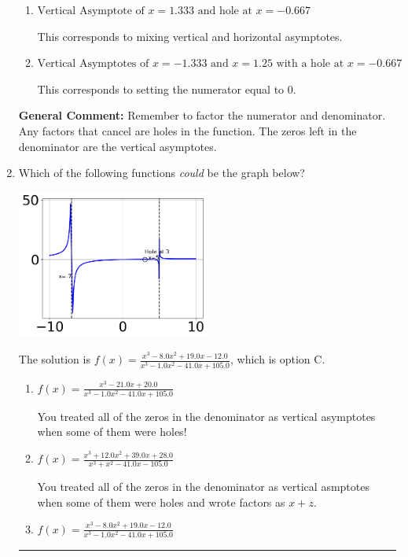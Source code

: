 \documentclass{extbook}[14pt]
\newcommand{\litem}[1]{\item #1

\rule{\textwidth}{0.4pt}}
\begin{document}
\begin{enumerate}
{\begin{enumerate}[label=\Alph*.]
This corresponds to considering where the denominator is equal to 0 as holes.
\item \( \text{Vertical Asymptote of } x = 1.333 \text{ and hole at } x = -0.667 \)

This corresponds to mixing vertical and horizontal asymptotes.
\item \( \text{Vertical Asymptotes of } x = -1.333 \text{ and } x = 1.25 \text{ with a hole at } x = -0.667 \)

This corresponds to setting the numerator equal to 0.
\end{enumerate}

\textbf{General Comment:} Remember to factor the numerator and denominator. Any factors that cancel are holes in the function. The zeros left in the denominator are the vertical asymptotes.
}
\litem{
Which of the following functions \textit{could} be the graph below?

\begin{center}
    \includegraphics[width=0.5\textwidth]{../Figures/identifyGraphOfRationalFunctionCopyC.png}
\end{center}


The solution is \( f(x)=\frac{x^{3} -8.0 x^{2} +19.0 x -12.0}{x^{3} -1.0 x^{2} -41.0 x + 105.0} \), which is option C.\begin{enumerate}[label=\Alph*.]
\item \( f(x)=\frac{x^{3} -21.0 x + 20.0}{x^{3} -1.0 x^{2} -41.0 x + 105.0} \)

You treated all of the zeros in the denominator as vertical asymptotes when some of them were holes!
\item \( f(x)=\frac{x^{3} +12.0 x^{2} +39.0 x + 28.0}{x^{3} + x^{2} -41.0 x -105.0} \)

You treated all of the zeros in the denominator as vertical asmptotes when some of them were holes and wrote factors as $x+z$.
\item \( f(x)=\frac{x^{3} -8.0 x^{2} +19.0 x -12.0}{x^{3} -1.0 x^{2} -41.0 x + 105.0} \)


\end{enumerate}}
\end{enumerate}
\end{document}
